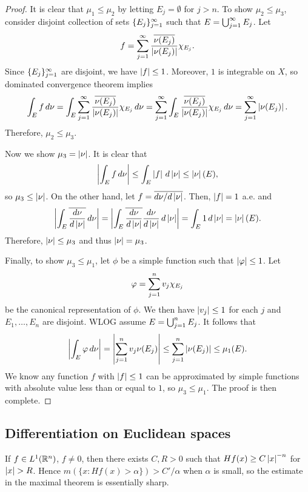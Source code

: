 \documentclass[a4paper]{article}
\begin{document}
\begin{proof}
It is clear that $\mu_1 \leq \mu_2$ by letting $E_j = \emptyset$
for $j > n$. To show $\mu_2 \leq \mu_3$, 
consider disjoint collection of sets $\{ E_j \}_{j=1}^\infty$ such 
that $E = \bigcup_{j=1}^\infty E_j$. Let 
\[
f = \sum_{j=1}^\infty \frac{\overline{\nu(E_j)}}{\left\lvert \nu(E_j)\right\rvert} \chi_{E_j}.
\]
Since $\{ E_j \}_{j=1}^\infty$ are disjoint, we have $\left\lvert f\right\rvert \leq 1$.
Moreover, $1$ is integrable on $X$, 
so dominated convergence theorem implies 
\[
\int_E f \, d \nu 
= \int_E \sum_{j=1}^\infty \frac{\overline{\nu(E_j)}}{\left\lvert \nu(E_j)\right\rvert} 
\chi_{E_j} \, d \nu
= \sum_{j=1}^\infty \int_E \frac{\overline{\nu(E_j)}}{\left\lvert \nu(E_j)\right\rvert} 
\chi_{E_j} \, d \nu
= \sum_{j=1}^\infty \left\lvert \nu(E_j)\right\rvert.
\]
Therefore, $\mu_2 \leq \mu_3$.

Now we show $\mu_3 = \left\lvert \nu\right\rvert$. 
It is clear that 
\[
\left\lvert \int_E f \, d \nu\right\rvert \leq \int_E \left\lvert f\right\rvert \, d \left\lvert \nu\right\rvert
\leq \left\lvert \nu\right\rvert (E),
\]
so $\mu_3 \leq \left\lvert \nu\right\rvert$.
On the other hand, let $f = \overline{d \nu / d \left\lvert \nu\right\rvert}$.
Then, $\left\lvert f\right\rvert = 1$ a.e. and 
\[
\left\lvert \int_E \overline{\frac{d \nu}{d \left\lvert \nu\right\rvert}} \, d \nu\right\rvert 
= \left\lvert \int_E \overline{\frac{d \nu}{d \left\lvert \nu\right\rvert}} 
\frac{d \nu}{d \left\lvert \nu\right\rvert} \, d \left\lvert \nu\right\rvert\right\rvert
= \int_E 1 \, d \left\lvert \nu\right\rvert
= \left\lvert \nu\right\rvert (E).
\]
Therefore, $\left\lvert \nu\right\rvert \leq \mu_3$ and thus $\left\lvert \nu\right\rvert 
= \mu_3$.

Finally, to show $\mu_3 \leq \mu_1$, let $\phi$ be a simple 
function such that $\left\lvert \varphi\right\rvert \leq 1$. Let 
\[
\varphi = \sum_{j=1}^n v_j \chi_{E_j}
\]
be the canonical representation of $\phi$. We then have 
$\left\lvert v_j\right\rvert \leq 1$ for each $j$ and $E_1, \dots, E_n$ 
are disjoint. WLOG assume 
$E = \bigcup_{j=1}^n E_j$. It follows that 
\[
\begin{aligned}
\left\lvert \int_E \varphi \, d \nu\right\rvert
= \left\lvert \sum_{j=1}^n v_j {\nu(E_j)}\right\rvert
\leq \sum_{j=1}^n \left\lvert \nu (E_j)\right\rvert \leq \mu_1 (E).
\end{aligned}
\]
We know any function $f$ with $\left\lvert f\right\rvert \leq 1$ can 
be approximated by simple functions with absolute 
value less than or equal to $1$, so $\mu_3 \leq \mu_1$. 
The proof is then complete.
\end{proof}

\subsection{Differentiation on Euclidean spaces}

\begin{ex}[Folland 3.22]
If $f \in L^1 (\mathbb{R}^n)$, $f \neq 0$, then there exists 
$C, R > 0$ such that $H f(x) \geq C \left\lvert x\right\rvert^{-n}$ for 
$\left\lvert x\right\rvert > R$. Hence $m (\{x : H f(x) > \alpha\}) > C' / \alpha$ 
when $\alpha$ is small, so the estimate in
the maximal theorem is essentially sharp.
\end{ex}
\end{document}
